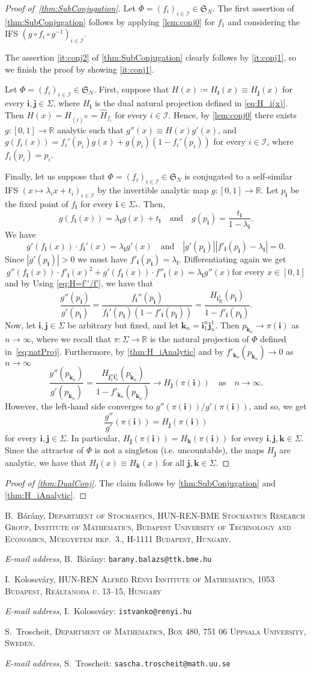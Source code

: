 \documentclass[11pt,]{article}
\makeatletter
\def\cref#1{\ref{#1}}%
\theoremstyle{definition}
\theoremstyle{remark}
\newcommand{\0}{\mathbf{0}}
\newcommand{\bi}{\mathbf{i}}
\newcommand{\bj}{\mathbf{j}}
\newcommand{\bk}{{\mathbf{k}}}
\numberwithin{equation}{section}
\newcommand{\Addresses}{{%
  \bigskip
  \footnotesize

  B.~B\'ar\'any, \textsc{Department of Stochastics, HUN-REN-BME Stochastics Research Group,
  Institute of Mathematics, Budapest University of Technology and Economics, M\H{u}egyetem rkp.~3.,
H-1111 Budapest, Hungary.}\par\nopagebreak
  \textit{E-mail address}, B.~B\'ar\'any: \texttt{barany.balazs@ttk.bme.hu}

  \medskip

  I.~Kolossv\'ary, \textsc{HUN-REN Alfr\'ed R\'enyi Institute of Mathematics, 1053 Budapest, Re\'altanoda u.
13–15, Hungary}\par\nopagebreak
  \textit{E-mail address}, I.~Kolossv\'ary: \texttt{istvanko@renyi.hu}
   \medskip


  S.~Troscheit, \textsc{Department of Mathematics, Box 480, 751 06 Uppsala University, Sweden.}\par\nopagebreak
  \textit{E-mail address}, S.~Troscheit: \texttt{sascha.troscheit@math.uu.se}
}}
\makeatother
\begin{document}
\begin{proof}[Proof of~\cref{thm:SubConjugation}]
	Let $\Phi=(f_i)_{i\in\mathcal{I}}\in\mathfrak{S}_N$. The first assertion of
	\cref{thm:SubConjugation} follows by applying \cref{lem:conj0} for $f_1$ and considering the
	IFS $(g\circ f_i\circ g^{-1})_{i\in\mathcal{I}}$.
	
	The assertion \cref{it:conj2} of \cref{thm:SubConjugation} clearly follows by
	\cref{it:conj1}, so we finish the proof by showing \cref{it:conj1}.
	
	Let $\Phi=(f_i)_{i\in\mathcal{I}}\in\mathfrak{S}_N$. First, suppose that $H(x)\coloneqq
	H_{\bi}(x)\equiv H_{\bj}(x)$ for every $\bi,\bj\in\Sigma$, where $H_{\bi}$ is the dual
	natural projection defined in \cref{eq:H_i(x)}. Then $H(x)=H_{(i)^{\infty}}=\hat{H}_{f_i}$
	for every $i\in\mathcal{I}$. Hence, by \cref{lem:conj0} there exists
	$g\colon[0,1]\to\mathbb{R}$ analytic such that $g''(x)\equiv H(x)g'(x)$, and
	$g(f_i(x))=f_i'(p_i)g(x)+g(p_i)(1-f_i'(p_i))$ for every $i\in\mathcal{I}$, where
	$f_i(p_i)=p_i$.
	
	Finally, let us suppose that $\Phi=(f_i)_{i\in\mathcal{I}}\in\mathfrak{S}_N$ is conjugated
	to a self-similar IFS $(x\mapsto \lambda_ix+t_i)_{i\in\mathcal{I}}$ by the invertible
	analytic map $g\colon[0,1]\to\mathbb{R}$. Let $p_{\bi}$ be the fixed point of $f_{\bi}$ for
	every $\bi\in\Sigma_*$. 
	Then,
\[
g(f_{\bi}(x)) = \lambda_{\bi} g(x) + t_{\bi}
\quad\text{and}\quad
g(p_{\bi}) = \frac{t_{\bi}}{1-\lambda_{\bi}}.
\]
We have
\[
g'(f_{\bi}(x))\cdot f_{\bi}'(x) = \lambda_{\bi} g'(x)
\quad\text{and}\quad
|g'(p_{\bi})||f'_{\bi}(p_{\bi})-\lambda_{\bi}| = 0.
\]
Since $|g'(p_{\bi})|>0$ we must have $f'_{\bi}(p_{\bi}) = \lambda_{\bi}$.
Differentiating again we get
\[
g''(f_{\bi}(x))\cdot f'_{\bi}(x)^2 +g'(f_{\bi}(x))\cdot f''_{\bi}(x) = \lambda_{\bi} g''(x)\text{
for every }x\in[0,1]
\]
and by Using \cref{eq:H=f''/f'}, we have that
\[
\frac{g''(p_{\bi})}{g'(p_{\bi})} =
\frac{f_{\bi}''(p_{\bi})}{f_{\bi}'(p_{\bi})(1-f'_{\bi}(p_{\bi}))}
=\frac{H_{\bi_{|\bi|}^1}(p_{\bi})}{1-f'_{\bi}(p_{\bi})}.
\]
Now, let $\bi,\bj\in\Sigma$ be arbitrary but fixed, and let $\bk_n = \bi_1^{n} \bj_n^1$. Then
$p_{\bk_n}\to \pi(\bi)$ as $n\to\infty$, where we recall that $\pi\colon\Sigma\to\mathbb{R}$ is the
natural projection of $\Phi$ defined in~\cref{eq:natProj}. Furthermore, by \cref{thm:H_iAnalytic} and by
$f'_{\bk_n}(p_{\bk_n})\to0$ as $n\to\infty$
\[
\frac{g''(p_{\bk_n})}{g'(p_{\bk_n})}
=\frac{H_{\bj_1^n \bi_n^1}(p_{\bk_n})}{1-f'_{\bk_n}(p_{\bk_n})}
\to
H_{\bj}(\pi(\bi))\quad \text{as}\quad n\to\infty.
\]
However, the left-hand side converges to $g''(\pi(\bi))/g'(\pi(\bi))$, and so, we get 
$$
\frac{g''}{g'}(\pi(\bi))=H_{\bj}(\pi(\bi))
$$
for every $\bi,\bj\in\Sigma$. In particular, $H_{\bj}(\pi(\bi))=H_{\bk}(\pi(\bi))$ for every
$\bi,\bj,\bk\in\Sigma$. Since the attractor of $\Phi$ is not a singleton (i.e. uncountable), the
maps $H_{\bj}$ are analytic, we have that $H_{\bj}(x)\equiv H_{\bk}(x)$ for all $\bj,\bk\in \Sigma$.
\end{proof}

\begin{proof}[Proof of \cref{thm:DualConj}]
	The claim follows by \cref{thm:SubConjugation} and \cref{thm:H_iAnalytic}.
\end{proof}






\Addresses
\end{document}
